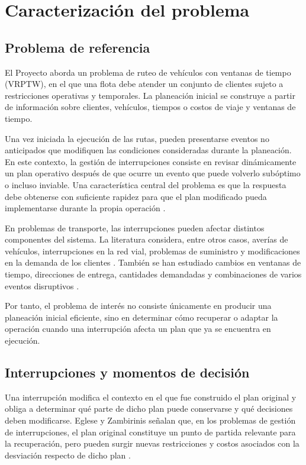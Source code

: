\documentclass[11pt]{article}
\begin{document}
\section{Caracterización del problema}

\subsection{Problema de referencia}

El Proyecto aborda un problema de ruteo de vehículos con ventanas de tiempo (VRPTW), en
el que una flota debe atender un conjunto de clientes sujeto a restricciones operativas y
temporales. La planeación inicial se construye a partir de información sobre clientes,
vehículos, tiempos o costos de viaje y ventanas de tiempo.

Una vez iniciada la ejecución de las rutas, pueden presentarse eventos no anticipados que modifiquen las condiciones consideradas durante la planeación. En este contexto, la gestión de interrupciones consiste en revisar dinámicamente un plan operativo después de que ocurre un evento que puede volverlo subóptimo o incluso inviable. Una característica central del problema es que la respuesta debe obtenerse con suficiente rapidez para que el plan modificado pueda implementarse durante la propia operación \parencite{eglese_zambirinis_2018}.

En problemas de transporte, las interrupciones pueden afectar distintos componentes del sistema. La literatura considera, entre otros casos, averías de vehículos, interrupciones en la red vial, problemas de suministro y modificaciones en la demanda de los clientes \parencite{eglese_zambirinis_2018}. También se han estudiado cambios en ventanas de tiempo, direcciones de entrega, cantidades demandadas y combinaciones de varios eventos disruptivos \parencite{wang_ruan_shi_2012}.

Por tanto, el problema de interés no consiste únicamente en producir una planeación inicial eficiente, sino en determinar cómo recuperar o adaptar la operación cuando una interrupción afecta un plan que ya se encuentra en ejecución.

\subsection{Interrupciones y momentos de decisión}

Una interrupción modifica el contexto en el que fue construido el plan original y obliga a determinar qué parte de dicho plan puede conservarse y qué decisiones deben modificarse. Eglese y Zambirinis señalan que, en los problemas de gestión de interrupciones, el plan original constituye un punto de partida relevante para la recuperación, pero pueden surgir nuevas restricciones y costos asociados con la desviación respecto de dicho plan \parencite{eglese_zambirinis_2018}.
\end{document}
